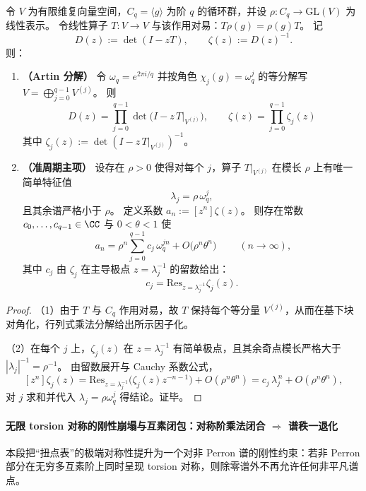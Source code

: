\begin{theorem}\label{thm:pom-torsion-q-artin-factorization-residue-fourier}
令 \(V\) 为有限维复向量空间，\(C_q=\langle g\rangle\) 为阶 \(q\) 的循环群，并设 \(\rho:C_q\to \mathrm{GL}(V)\) 为线性表示。
令线性算子 \(T:V\to V\) 与该作用对易：\(T\rho(g)=\rho(g)T\)。
记
\[
D(z):=\det(I-zT),
\qquad
\zeta(z):=D(z)^{-1}.
\]
则：
\begin{enumerate}
  \item \textbf{（Artin 分解）} 令 \(\omega_q=e^{2\pi i/q}\) 并按角色 \(\chi_j(g)=\omega_q^j\) 的等分解写
  \(
  V=\bigoplus_{j=0}^{q-1}V^{(j)}
  \)。
  则
  \[
  \boxed{\;
  D(z)=\prod_{j=0}^{q-1}\det\!\bigl(I-z\,T|_{V^{(j)}}\bigr),
  \qquad
  \zeta(z)=\prod_{j=0}^{q-1}\zeta_j(z)\;}
  \]
  其中 \(\zeta_j(z):=\det(I-z\,T|_{V^{(j)}})^{-1}\)。
  \item \textbf{（准周期主项）} 设存在 \(\rho>0\) 使得对每个 \(j\)，算子 \(T|_{V^{(j)}}\) 在模长 \(\rho\) 上有唯一简单特征值
  \[
  \lambda_j=\rho\,\omega_q^j,
  \]
  且其余谱严格小于 \(\rho\)。
  定义系数 \(a_n:=[z^n]\zeta(z)\)。
  则存在常数 \(c_0,\dots,c_{q-1}\in\CC\) 与 \(0<\theta<1\) 使
  \[
  \boxed{\;
  a_n=\rho^n\sum_{j=0}^{q-1}c_j\,\omega_q^{jn}+O\!\bigl(\rho^n\theta^n\bigr)\;}
  \qquad(n\to\infty),
  \]
  其中 \(c_j\) 由 \(\zeta_j\) 在主导极点 \(z=\lambda_j^{-1}\) 的留数给出：
  \[
  c_j=\mathrm{Res}_{z=\lambda_j^{-1}}\zeta_j(z).
  \]
\end{enumerate}
\end{theorem}
\begin{proof}
（1）由于 \(T\) 与 \(C_q\) 作用对易，故 \(T\) 保持每个等分量 \(V^{(j)}\)，从而在基下块对角化，行列式乘法分解给出所示因子化。
\par
（2）在每个 \(j\) 上，\(\zeta_j(z)\) 在 \(z=\lambda_j^{-1}\) 有简单极点，且其余奇点模长严格大于 \(|\lambda_j|^{-1}=\rho^{-1}\)。
由留数展开与 Cauchy 系数公式，
\[
[z^n]\zeta_j(z)=\mathrm{Res}_{z=\lambda_j^{-1}}\bigl(\zeta_j(z)z^{-n-1}\bigr)+O(\rho^n\theta^n)
=c_j\,\lambda_j^{\,n}+O(\rho^n\theta^n),
\]
对 \(j\) 求和并代入 \(\lambda_j=\rho\omega_q^j\) 得结论。证毕。
\end{proof}

\paragraph{无限 torsion 对称的刚性崩塌与互素闭包：对称阶乘法闭合 \texorpdfstring{$\Rightarrow$}{=>} 谱秩一退化}
本段把“扭点表”的极端对称性提升为一个对非 Perron 谱的刚性约束：若非 Perron 部分在无穷多互素阶上同时呈现 torsion 对称，则除零谱外不再允许任何非平凡谱点。

